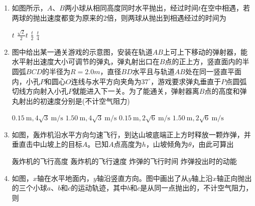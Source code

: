 \begin{enumerate}[leftmargin=0em]
\item 
{}
如图所示，$ A $、$ B $两小球从相同高度同时水平抛出，经过时间$ t $在空中相遇，若两球的抛出速度都变为原来的$ 2 $倍，则两球从抛出到相遇经过的时间为  
\begin{figure}[h!]
\centering

\end{figure}

\fourchoices
{$ t $}
{$ \frac{\sqrt{2}}{2}t $}
{$ \frac{t}{2} $}
{$ \frac{t}{4} $}




\item 
{}
图中给出某一通关游戏的示意图，安装在轨道$ AB $上可上下移动的弹射器，能水平射出速度大小可调节的弹丸，弹丸射出口在$ B $点的正上方，竖直面内的半圆弧$ BCD $的半径为$ R=2.0m $，直径$ BD $水平且与轨道$ AB $处在同一竖直平面内，小孔$ P $和圆心$ O $连线与水平方向夹角为$ 37 ^{\circ} $，游戏要求弹丸垂直于$ P $点圆弧切线方向射入小孔$ P $就能进入下一关。为了能通关，弹射器离$ B $点的高度和弹丸射出的初速度分别是(不计空气阻力)  
\begin{figure}[h!]
\centering

\end{figure}

\fourchoices
{$ 0.15\ \mathrm { m } , 4 \sqrt { 3 }\ \mathrm { m } / \mathrm { s } $}
{$ 1.50\ \mathrm { m } , 4 \sqrt { 3 }\ \mathrm { m } / \mathrm { s } $}
{$ 0.15\ \mathrm { m } , 2 \sqrt { 6 }\ \mathrm { m } / \mathrm { s } $}
{$ 1.50\ \mathrm { m } , 2 \sqrt { 6 }\ \mathrm { m } / \mathrm { s } $}




\item 
{}
如图，轰炸机沿水平方向匀速飞行，到达山坡底端正上方时释放一颗炸弹，并垂直击中山坡上的目标$ A $。已知$ A $点高度为$ h $，山坡倾角为$ \theta $，由此可算出  
\begin{figure}[h!]
\centering

\end{figure}

\fourchoices
{轰炸机的飞行高度}
{轰炸机的飞行速度}
{炸弹的飞行时间}
{炸弹投出时的动能}


\item 
{}
如图，$ x $轴在水平地面内，$ y $轴沿竖直方向。图中画出了从$ y $轴上沿$ x $轴正向抛出的三个小球$ a $、$ b $和$ c $的运动轨迹，其中$ b $和$ c $是从同一点抛出的，不计空气阻力，则  
\begin{figure}[h!]
\centering

\end{figure}


\end{enumerate}
